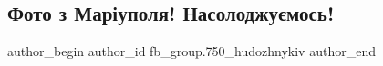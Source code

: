  
 
 
 
 

\subsection{Фото з Маріуполя!  Насолоджуємось!}
\label{sec:26_04_2019.fb.fb_group.750_hudozhnykiv.2.foto_z_mariupolja}

\ifcmt
 author_begin
   author_id fb_group.750_hudozhnykiv
 author_end
\fi
